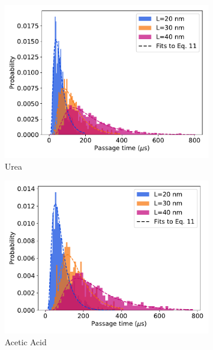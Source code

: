 \documentclass{article}
\begin{document}
  \begin{figure}
  \centering
  \begin{subfigure}{0.45\textwidth}
  \includegraphics[width=\textwidth]{msddm_fpt_distributions_URE.pdf}
  \caption{Urea}\label{fig:URE_msddm_fpt_distributions}
  \end{subfigure}
  \begin{subfigure}{0.45\textwidth}
  \includegraphics[width=\textwidth]{msddm_fpt_distributions_ACH.pdf}
  \caption{Acetic Acid}\label{fig:ACH_msddm_fpt_distributions}
  \end{subfigure}
  \begin{subfigure}{0.45\textwidth}

\end{subfigure}
\end{figure}
\end{document}
